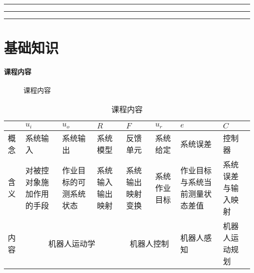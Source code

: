 \documentclass[
12pt, %
a4paper, 
oneside, %
headinclude,footinclude, %
]{scrartcl}
\title{\normalfont\spacedallcaps{智能工程}}
\date{}
\begin{document}
\maketitle
\newpage
\hypertarget{toc}{}
\begingroup
\begin{multicols}{2}
\tableofcontents
\end{multicols}
\endgroup
\hrule
\begingroup
\begin{multicols}{2}
\listoffigures
\end{multicols}
\endgroup
\hrule
\begingroup
\begin{multicols}{2}
\listoftables
\end{multicols}
\endgroup
\hrule
\begingroup
\begin{multicols}{2}
\listoftips
\end{multicols}
\endgroup
\newpage
\section{基础知识}
\paragraph{课程内容}
\begin{figure}[H]
\centering
{} \quad
{}
\caption{课程内容}
\end{figure}

\begin{table}[H]
\centering
\begin{tabular}{|p{0.5cm}|p{2cm}|p{2cm}|p{2cm}|p{2cm}|p{2cm}|p{2cm}|p{2cm}|}
\hline
& $ u_i $ & $ u_o $ & $ R $ & $ F $ & $ u_r $ & $ e $ & $ C $ \\
\hline
概念 & 系统输入 & 系统输出 & 系统模型 & 反馈单元 & 系统给定 & 系统误差 & 控制器 \\
\hline
含义 & 对被控对象施加作用的手段 & 作业目标的可测系统状态 & 系统输入输出映射 & 系统输出映射变换 & 系统作业目标 & 作业目标与系统当前测量状态差值 & 系统误差与输入映射 \\
\hline
内容 & \multicolumn{3}{c|}{机器人运动学} & \multicolumn{2}{c|}{机器人控制} & 机器人感知 & 机器人运动规划 \\
\hline
\end{tabular}
\caption{课程内容}
\end{table}
\end{document}
